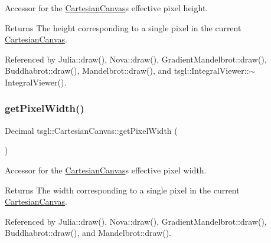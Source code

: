 Accessor for the \hyperlink{classtsgl_1_1_cartesian_canvas}{Cartesian\+Canvas}\textquotesingle{}s effective pixel height. 

\begin{DoxyReturn}{Returns}
The height corresponding to a single pixel in the current \hyperlink{classtsgl_1_1_cartesian_canvas}{Cartesian\+Canvas}. 
\end{DoxyReturn}


Referenced by Julia\+::draw(), Nova\+::draw(), Gradient\+Mandelbrot\+::draw(), Buddhabrot\+::draw(), Mandelbrot\+::draw(), and tsgl\+::\+Integral\+Viewer\+::$\sim$\+Integral\+Viewer().

\mbox{\label{classtsgl_1_1_cartesian_canvas_ac9bb990b8c34a1575bcb861e4b819372}} 
\subsubsection{\texorpdfstring{get\+Pixel\+Width()}{getPixelWidth()}}
{\footnotesize\ttfamily Decimal tsgl\+::\+Cartesian\+Canvas\+::get\+Pixel\+Width (\begin{DoxyParamCaption}{ }\end{DoxyParamCaption})\hspace{0.3cm}{\ttfamily [inline]}}



Accessor for the \hyperlink{classtsgl_1_1_cartesian_canvas}{Cartesian\+Canvas}\textquotesingle{}s effective pixel width. 

\begin{DoxyReturn}{Returns}
The width corresponding to a single pixel in the current \hyperlink{classtsgl_1_1_cartesian_canvas}{Cartesian\+Canvas}. 
\end{DoxyReturn}


Referenced by Julia\+::draw(), Nova\+::draw(), Gradient\+Mandelbrot\+::draw(), Buddhabrot\+::draw(), and Mandelbrot\+::draw().

\mbox{\label{classtsgl_1_1_cartesian_canvas_a8fea34cfcee9bc577c1e1ab6d28a8185}} 
